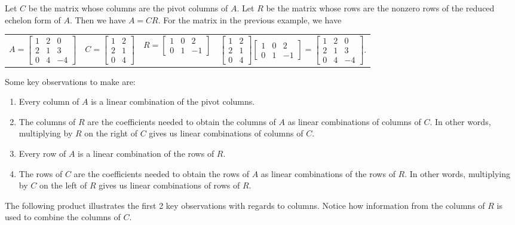\documentclass[10pt]{article}
\begin{document}
Let $C$ be the matrix whose columns are the pivot columns of $A$.  Let $R$ be the matrix whose rows are the nonzero rows of the reduced echelon form of $A$.  Then we have $A=CR$.  For the matrix in the previous example, we have  
\begin{center}\begin{tabular}{cccc}
$A=\begin {bmatrix} 1&2&0\\2&1&3\\0&4&-4 \end {bmatrix}$&
$C=\begin {bmatrix} 1&2\\2&1\\0&4 \end {bmatrix}$&
$R=\begin {bmatrix} 1&0&2\\0&1&-1 \end {bmatrix}$&
$\begin {bmatrix} 1&2\\2&1\\0&4 \end {bmatrix}\begin {bmatrix} 1&0&2\\0&1&-1 \end {bmatrix} = \begin {bmatrix} 1&2&0\\2&1&3\\0&4&-4 \end {bmatrix} $.
\end{tabular}\end{center}
Some key observations to make are:
\begin{enumerate}
	\item Every column of $A$ is a linear combination of the pivot columns. 
  \item The columns of $R$ are the coefficients needed to obtain the columns of $A$ as linear combinations of columns of $C$.
       In other words, multiplying by $R$ on the right of $C$ gives us linear combinations of columns of $C$.
  \item Every row of $A$ is a linear combination of the rows of $R$.
	\item The rows of $C$ are the coefficients needed to obtain the rows of $A$ as linear combinations of the rows of $R$.
       In other words, multiplying by $C$ on the left of $R$ gives us linear combinations of rows of $R$.
\end{enumerate}
The following product illustrates the first 2 key observations with regards to columns. Notice how information from the columns of $R$ is used to combine the columns of $C$.
\end{document}
